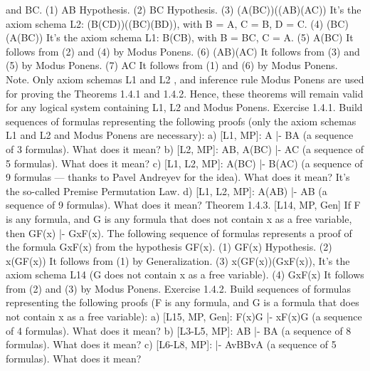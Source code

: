 and B\IMPLIES C.
(1) A\IMPLIES B
Hypothesis.
(2) B\IMPLIES C Hypothesis.
(3) (A\IMPLIES (B\IMPLIES C))\IMPLIES ((A\IMPLIES B)\IMPLIES (A\IMPLIES C)) It's the axiom schema L2:
                                       (B\IMPLIES (C\IMPLIES D))\IMPLIES ((B\IMPLIES C)\IMPLIES (B\IMPLIES D)), with B =
                                                  A, C = B, D = C.
(4) (B\IMPLIES C)\IMPLIES (A\IMPLIES (B\IMPLIES C)) It's the axiom schema L1: B\IMPLIES (C\IMPLIES B), with B
                               = B\IMPLIES C, C = A.
(5) A\IMPLIES (B\IMPLIES C) It follows from (2) and (4) by Modus Ponens.
(6) (A\IMPLIES B)\IMPLIES (A\IMPLIES C) It follows from (3) and (5) by Modus Ponens.
(7) A\IMPLIES C It follows from (1) and (6) by Modus Ponens.
Note. Only axiom schemas L1 and L2 , and inference rule Modus Ponens are used for proving the
Theorems 1.4.1 and 1.4.2. Hence, these theorems will remain valid for any logical system containing
L1, L2 and Modus Ponens.
Exercise 1.4.1. Build sequences of formulas representing the following proofs (only the axiom schemas
L1 and L2 and Modus Ponens are necessary):
a) [L1, MP]: A |- B\IMPLIES A (a sequence of 3 formulas). What does it mean?
b) [L2, MP]: A\IMPLIES B, A\IMPLIES (B\IMPLIES C) |- A\IMPLIES C (a sequence of 5 formulas). What does it mean?
c) [L1, L2, MP]: A\IMPLIES (B\IMPLIES C) |- B\IMPLIES (A\IMPLIES C) (a sequence of 9 formulas --- thanks to Pavel Andreyev for the
idea). What does it mean? It's the so-called Premise Permutation Law.
d) [L1, L2, MP]: A\IMPLIES (A\IMPLIES B) |- A\IMPLIES B (a sequence of 9 formulas). What does it mean?
Theorem 1.4.3. [L14, MP, Gen] If F is any formula, and G is any formula that does not contain x as a free
variable, then
G\IMPLIES F(x) |- G\IMPLIES \forall xF(x).
The following sequence of formulas represents a proof of the formula G\IMPLIES \forall xF(x) from the hypothesis
G\IMPLIES F(x).
(1) G\IMPLIES F(x) Hypothesis.
(2) \forall x(G\IMPLIES F(x)) It follows from (1) by Generalization.
(3) \forall x(G\IMPLIES F(x))\IMPLIES (G\IMPLIES \forall xF(x)), It's the axiom schema L14 (G does not
                                    contain x as a free variable).
(4) G\IMPLIES \forall xF(x) It follows from (2) and (3) by Modus Ponens.
Exercise 1.4.2. Build sequences of formulas representing the following proofs (F is any formula, and G is
a formula that does not contain x as a free variable):
a) [L15, MP, Gen]: F(x)\IMPLIES G |- \exists xF(x)\IMPLIES G (a sequence of 4 formulas). What does it mean?
b) [L3-L5, MP]: A\AND B |- B\AND A (a sequence of 8 formulas). What does it mean?
c) [L6-L8, MP]: |- AvB\IMPLIES BvA (a sequence of 5 formulas). What does it mean?
